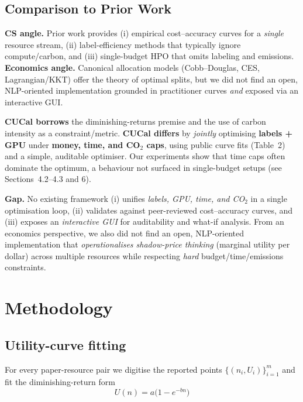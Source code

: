 \documentclass[11pt]{article}
\begin{document}
\subsection{Comparison to Prior Work}

\textbf{CS angle.} Prior work provides (i) empirical cost--accuracy curves for a \emph{single} resource stream, (ii) label-efficiency methods that typically ignore compute/carbon, and (iii) single-budget HPO that omits labeling and emissions. 
\textbf{Economics angle.} Canonical allocation models (Cobb--Douglas, CES, Lagrangian/KKT) offer the theory of optimal splits, but we did not find an open, NLP-oriented implementation grounded in practitioner curves \emph{and} exposed via an interactive GUI.

\textbf{CUCal borrows} the diminishing-returns premise and the use of carbon intensity as a constraint/metric. \textbf{CUCal differs} by \emph{jointly} optimising \textbf{labels + GPU} under \textbf{money, time, and CO$_2$ caps}, using public curve fits (Table~2) and a simple, auditable optimiser. Our experiments show that time caps often dominate the optimum, a behaviour not surfaced in single-budget setups (see Sections~4.2--4.3 and 6).

\noindent\textbf{Gap.}
No existing framework (i) unifies \emph{labels, GPU, time, and CO$_2$} in a single optimisation loop, (ii) validates against peer-reviewed cost--accuracy curves, and (iii) exposes an \emph{interactive GUI} for auditability and what-if analysis. From an economics perspective, we also did not find an open, NLP-oriented implementation that \emph{operationalises shadow-price thinking} (marginal utility per dollar) across multiple resources while respecting \emph{hard} budget/time/emissions constraints.


\section{Methodology}\label{sec:methodology}

\subsection{Utility-curve fitting}\label{sec:method:fit}
For every paper-resource pair we digitise the reported points
\(\{(n_i,U_i)\}_{i=1}^{m}\)%
\allowbreak and fit the diminishing-return form
\[
  U(n)=a\bigl(1-e^{-bn}\bigr)
\]
\end{document}
